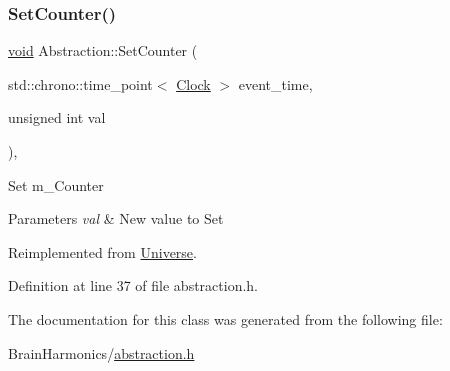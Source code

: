 \subsubsection{\texorpdfstring{Set\+Counter()}{SetCounter()}}
{\footnotesize\ttfamily \mbox{\hyperlink{glad_8h_a950fc91edb4504f62f1c577bf4727c29}{void}} Abstraction\+::\+Set\+Counter (\begin{DoxyParamCaption}\item[{std\+::chrono\+::time\+\_\+point$<$ \mbox{\hyperlink{universe_8h_a0ef8d951d1ca5ab3cfaf7ab4c7a6fd80}{Clock}} $>$}]{event\+\_\+time,  }\item[{unsigned int}]{val }\end{DoxyParamCaption})\hspace{0.3cm}{\ttfamily [inline]}, {\ttfamily [virtual]}}

Set m\+\_\+\+Counter 
\begin{DoxyParams}{Parameters}
{\em val} & New value to Set \\
\hline
\end{DoxyParams}


Reimplemented from \mbox{\hyperlink{class_universe_aa22202ae740eb1355529afcb13285e91}{Universe}}.



Definition at line 37 of file abstraction.\+h.



The documentation for this class was generated from the following file\+:\begin{DoxyCompactItemize}
\item 
Brain\+Harmonics/\mbox{\hyperlink{abstraction_8h}{abstraction.\+h}}\end{DoxyCompactItemize}
